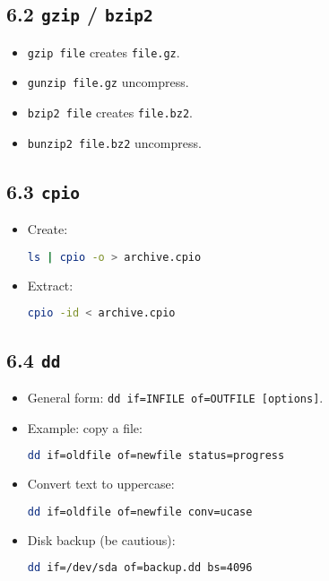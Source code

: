 \documentclass[a4paper]{report}
\begin{document}
\subsection*{6.2 \texttt{gzip} / \texttt{bzip2}}
\begin{itemize}
    \item \texttt{gzip file} \textrightarrow creates \texttt{file.gz}.
    \item \texttt{gunzip file.gz} \textrightarrow uncompress.
    \item \texttt{bzip2 file} \textrightarrow creates \texttt{file.bz2}.
    \item \texttt{bunzip2 file.bz2} \textrightarrow uncompress.
\end{itemize}

\subsection*{6.3 \texttt{cpio}}
\begin{itemize}
    \item Create:
\begin{lstlisting}[language=bash]
ls | cpio -o > archive.cpio
\end{lstlisting}
    \item Extract:
\begin{lstlisting}[language=bash]
cpio -id < archive.cpio
\end{lstlisting}
\end{itemize}

\subsection*{6.4 \texttt{dd}}
\begin{itemize}
    \item General form: \texttt{dd if=INFILE of=OUTFILE [options]}.
    \item Example: copy a file:
\begin{lstlisting}[language=bash]
dd if=oldfile of=newfile status=progress
\end{lstlisting}
    \item Convert text to uppercase:
\begin{lstlisting}[language=bash]
dd if=oldfile of=newfile conv=ucase
\end{lstlisting}
    \item Disk backup (be cautious):
\begin{lstlisting}[language=bash]
dd if=/dev/sda of=backup.dd bs=4096
\end{lstlisting}
\end{itemize}
\end{document}
